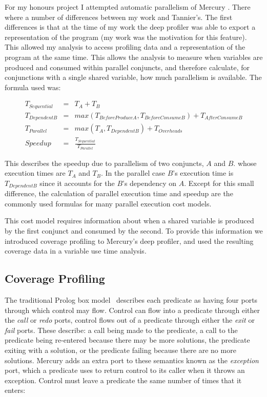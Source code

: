 For my honours project I attempted automatic parallelism of Mercury
\citep{bone:2008:hons}.
There where a number of differences between my work and Tannier's.
The first differences is that at the time of my work the deep profiler
was able to export a representation of the program
(my work was the motivation for this feature).
This allowed my analysis to access profiling data and a representation
of the program at the same time.
This allows the analysis to measure when variables are produced and
consumed within parallel conjuncts,
and therefore calculate,
for conjunctions with a single shared variable,
how much parallelism is available.
The formula used was:

\begin{eqnarray*}
T_{Sequential} & = & T_A + T_B \\
T_{DependentB} & = & max(T_{BeforeProduceA}, T_{BeforeConsumeB}) +
T_{AfterConsumeB} \\
T_{Parallel} & = & max(T_A, T_{DependentB}) + T_{Overheads} \\
Speedup & = & \frac{T_{Sequential}}{T_{Parallel}}
\end{eqnarray*}

This describes the speedup due to parallelism of two conjuncts, $A$ and $B$.
whose execution times are $T_A$ and $T_B$.
In the parallel case $B$'s execution time is $T_{DependentB}$ since it
accounts for the $B$'s dependency on $A$.
Except for this small difference,
the calculation of parallel execution time and speedup are the commonly
used formulas for many parallel execution cost models.

This cost model requires information about when a shared variable is
produced by the first conjunct and consumed by the second.
To provide this information we introduced coverage profiling to
Mercury's deep profiler,
and used the resulting coverage data in a variable use time analysis.

\subsection{Coverage Profiling}
\label{sec:coverage}

The traditional Prolog box
model~\citep{adventures_in_prolog} describes each predicate
as having four ports through which control may flow.
Control can flow into a predicate through either the \emph{call} or
\emph{redo} ports,
control flows out of a predicate through either the \emph{exit} or
\emph{fail} ports.
These describe:
    a call being made to the predicate,
    a call to the predicate being re-entered because there may be more
    solutions,
    the predicate exiting with a solution,
    or the predicate failing because there are no more solutions.
Mercury adds an extra port to these semantics known as the
\emph{exception} port,
which a predicate uses to return control to its caller when it throws an
exception.
Control must leave a predicate the same number of times that it enters:

